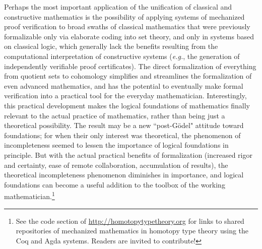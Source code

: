 \documentclass[11pt]{article}
\theoremstyle{remark}
\theoremstyle{definition}
\begin{document}
Perhaps the most important application of the unification of classical and constructive mathematics is the possibility
of applying systems of mechanized proof verification to broad swaths of classical mathematics that were previously
formalizable only via elaborate coding into set theory, and only in systems based on classical logic, which generally
lack the benefits resulting from the computational interpretation of constructive systems (\textit{e.g.}, the generation
of independently verifiable proof certificates).  The direct formalization of everything from quotient sets to
cohomology simplifies and streamlines the formalization of even advanced mathematics, and has the potential to
eventually make formal verification into a practical tool for the everyday mathematician.  Interestingly, this practical
development makes the logical foundations of mathematics finally relevant to the actual practice of mathematics, rather
than being just a theoretical possibility.  The result may be a new ``post-G\"odel" attitude toward foundations; for
when their only interest was theoretical, the phenomenon of incompleteness seemed to lessen the importance of logical
foundations in principle.  But with the actual practical benefits of formalization (increased rigor and certainty, ease
of remote collaboration, accumulation of results), the theoretical incompleteness phenomenon diminishes in importance,
and logical foundations can become a useful addition to the toolbox of the working mathematician.\footnote{See the code
  section of \url{http://homotopytypetheory.org} for links to shared repositories of mechanized mathematics in homotopy
  type theory using the Coq and Agda systems.  Readers are invited to contribute!}

\end{document}
